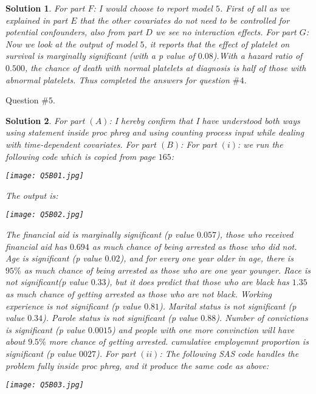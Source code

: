 \documentclass[11pt]{article}
\newtheorem{sol}{Solution}
\begin{document}
\begin{sol}
	For part $F$:\vskip 2mm
	I would choose to report model $5$. First of all as we explained in part $E$ that the other covariates do not need to be controlled for potential confounders, also from part $D$ we see no interaction effects.\vskip 2mm
	For part $G$:\vskip 2mm
	Now we look at the output of model $5$, it reports that the effect of platelet on survival is marginally significant (with a p value of $0.08$).With a hazard ratio of $0.500$, the chance of death with normal platelets at diagnosis is half of those with abnormal platelets.\vskip 2mm
	Thus completed the answers for question $\#4$.
\end{sol}

Question $\# 5$.
\begin{sol}
	For part $(A)$:\vskip 2mm
	I hereby confirm that I have understood both ways using statement inside proc phreg and using counting process input while dealing with time-dependent covariates.\vskip 2mm
	For part $(B)$:\vskip 2mm
	For part $(i)$:\vskip 2mm
	we run the following code which is copied from page $165$:
	\begin{center}
		\texttt{[image: Q5B01.jpg]}
	\end{center}
	The output is:
	\begin{center}
		\texttt{[image: Q5B02.jpg]}
	\end{center}
	The financial aid is marginally significant (p value $0.057$), those who received financial aid has $0.694$ as much chance of being arrested as those who did not.\vskip 2mm
	Age is significant (p value $0.02$), and for every one year older in age, there is $95\%$ as much chance of being arrested as those who are one year younger.\vskip 2mm
	Race is not significant(p value $0.33$), but it does predict that those who are black has $1.35$ as much chance of getting arrested as those who are not black.\vskip 2mm
	Working experience is not significant (p value $0.81$).\vskip 2mm
	Marital status is not significant (p value $0.34$).\vskip 2mm
	Parole status is not significant (p value $0.88$).\vskip 2mm
	Number of convictions is significant (p value $0.0015$) and people with one more convinction will have about $9.5\%$ more chance of getting arrested.\vskip 2mm
	cumulative employemnt proportion is significant (p value $0027$).\vskip 2mm
	For part $(ii)$:\vskip 2mm
	The following SAS code handles the problem fully inside proc phreg, and it produce the same code as above:
	\begin{center}
		\texttt{[image: Q5B03.jpg]}
	\end{center}

\end{sol}
\end{document}
